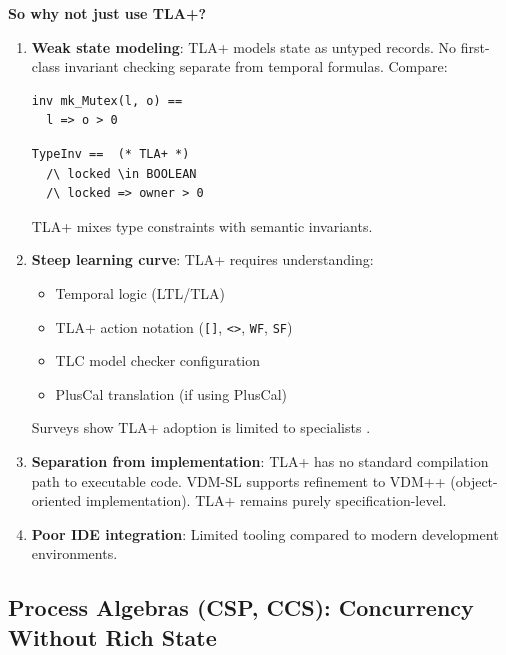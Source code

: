 \documentclass[11pt]{article}
\begin{document}
\textbf{So why not just use TLA+?}

\begin{enumerate}[leftmargin=*]
\item \textbf{Weak state modeling}: TLA+ models state as untyped records. No first-class invariant checking separate from temporal formulas. Compare:

\begin{minipage}{0.48\textwidth}
\begin{lstlisting}[caption={VDM-SL (clear invariants)}]
inv mk_Mutex(l, o) ==
  l => o > 0
\end{lstlisting}
\end{minipage}
\hfill
\begin{minipage}{0.48\textwidth}
\begin{verbatim}
TypeInv ==  (* TLA+ *)
  /\ locked \in BOOLEAN
  /\ locked => owner > 0
\end{verbatim}
\end{minipage}

TLA+ mixes type constraints with semantic invariants.

\item \textbf{Steep learning curve}: TLA+ requires understanding:
\begin{itemize}
\item Temporal logic (LTL/TLA)
\item TLA+ action notation (\texttt{[]}, \texttt{<>}, \texttt{WF}, \texttt{SF})
\item TLC model checker configuration
\item PlusCal translation (if using PlusCal)
\end{itemize}

Surveys show TLA+ adoption is limited to specialists \cite{kuppe2021}.

\item \textbf{Separation from implementation}: TLA+ has no standard compilation path to executable code. VDM-SL supports refinement to VDM++ (object-oriented implementation). TLA+ remains purely specification-level.

\item \textbf{Poor IDE integration}: Limited tooling compared to modern development environments.
\end{enumerate}

\subsection{Process Algebras (CSP, CCS): Concurrency Without Rich State}
\end{document}
